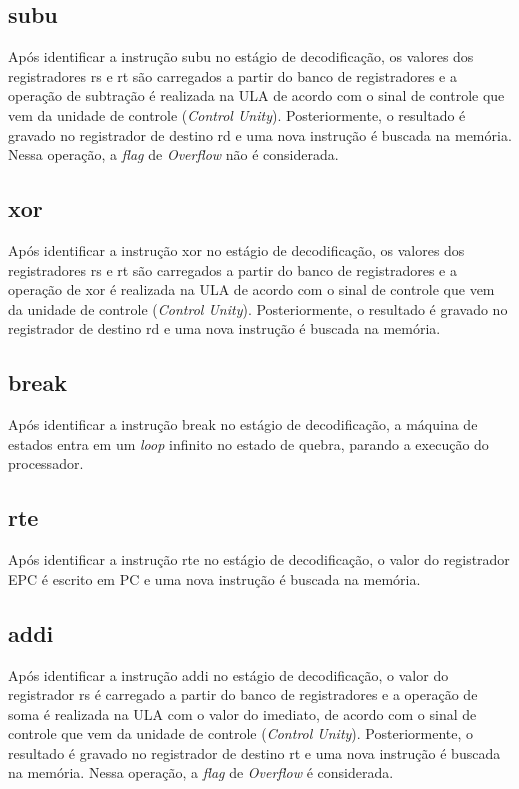\documentclass{article}
\begin{document}
    \subsection{subu}
    Após identificar a instrução subu no estágio de decodificação, os valores dos registradores rs e rt são carregados a partir do banco de registradores e a operação de subtração é realizada na ULA de acordo com o sinal de controle que vem da unidade de controle ({\it Control Unity}). Posteriormente, o resultado é gravado no registrador de destino rd e uma nova instrução é buscada na memória. Nessa operação, a {\it flag} de {\it Overflow} não é considerada.
    \\
    \subsection{xor}
    Após identificar a instrução xor no estágio de decodificação, os valores dos registradores rs e rt são carregados a partir do banco de registradores e a operação de xor é realizada na ULA de acordo com o sinal de controle que vem da unidade de controle ({\it Control Unity}). Posteriormente, o resultado é gravado no registrador de destino rd e uma nova instrução é buscada na memória.
    \\
    \subsection{break}
    Após identificar a instrução break no estágio de decodificação, a máquina de estados entra em um {\it loop} infinito no estado de quebra, parando a execução do processador.
    \\
    \subsection{rte}
    Após identificar a instrução rte no estágio de decodificação, o valor do registrador EPC é escrito em PC e uma nova instrução é buscada na memória.
    \\
    \subsection{addi}
    Após identificar a instrução addi no estágio de decodificação, o valor do registrador rs é carregado a partir do banco de registradores e a operação de soma é realizada na ULA com o valor do imediato, de acordo com o sinal de controle que vem da unidade de controle ({\it Control Unity}). Posteriormente, o resultado é gravado no registrador de destino rt e uma nova instrução é buscada na memória. Nessa operação, a {\it flag} de {\it Overflow} é considerada.
    \\
\end{document}
